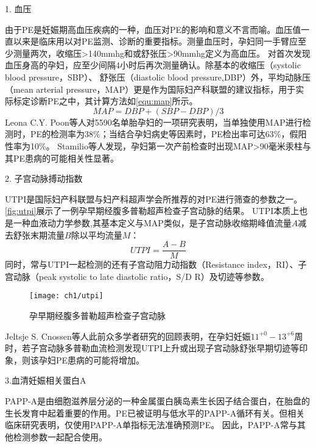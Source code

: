 1. 血压

由于PE是妊娠期高血压疾病的一种\cite{OAG9,HDASOM,2000s1}，血压对PE的影响和意义不言而喻。血压值一直以来是临床用以对PE监测、诊断的重要指标。测量血压时，孕妇同一手臂应至少测量两次，收缩压>140mmhg和或舒张压>90mmhg定义为高血压。
对首次发现血压身高的孕妇，应至少间隔4小时后再次测量确认\cite{OAG9}。除基本的收缩压（systolic blood pressure，SBP）、
舒张压（diastolic blood pressure,DBP）外，平均动脉压（mean arterial pressure，MAP）更是作为国际妇产科联盟的建议指标，用于实际标定诊断PE之中，其计算方法如\autoref{equ:map}所示\cite{FIGO}。
\begin{equation}
    \label{equ:map}
    MAP=DBP+(SBP-DBP)/3
\end{equation}
Leona C.Y. Poon\cite{Poon2008}等人对5590名单胎孕妇的一项研究表明，当单独使用MAP进行检测时，PE的检测率为38\%；当结合孕妇病史等因素时，PE检出率可达63\%，假阳性率为10\%。
Stamilio等人\cite{Stamilio2000}发现，孕妇第一次产前检查时出现MAP>90毫米汞柱与其PE患病的可能相关性显著。

2. 子宫动脉搏动指数

UTPI是国际妇产科联盟与妇产科超声学会所推荐的对PE进行筛查的参数之一\cite{FIGO,Sotiriadis2019}。\autoref{fig:utpi}展示了一例孕早期经腹多普勒超声检查子宫动脉的结果\cite{Sotiriadis2019}。
UTPI本质上也是一种血液动力学参数,其基本定义与MAP类似，是子宫动脉收缩期峰值流量$A$减去舒张末期流量$B$除以平均流量$M$\cite{Cnossen2008}：
\begin{equation}
    \label{equ:utpi}
    UTPI=\frac{A-B}{M}
\end{equation}
同时，常与UTPI一起检测的还有子宫动阻力动指数（Resistance index，RI）、子宫动脉（peak systolic to late diastolic ratio，S/D R）及切迹等参数\cite{Cnossen2008}。
\begin{figure}[htbp]
    \centering
    \texttt{[image: ch1/utpi]}
    \caption{\label{fig:utpi}孕早期经腹多普勒超声检查子宫动脉}
\end{figure}
Jeltsje S. Cnossen等人\cite{Cnossen2008}此前众多学者研究的回顾表明，在孕妇妊娠$11^{+0}-13^{+6}$周时，若子宫动脉多普勒血流检测发现UTPI上升或出现子宫动脉舒张早期切迹等印象，则该孕妇PE患病的可能将增加\cite{OAG9,Plasencia2008}。

3.血清妊娠相关蛋白A

PAPP-A是由细胞滋养层分泌的一种金属蛋白胰岛素生长因子结合蛋白，在胎盘的生长发育中起着重要的作用。PE已被证明与低水平的PAPP-A循环有关\cite{FIGO}。但相关临床研究表明，仅使用PAPP-A单指标无法准确预测PE\cite{Smith2002}。
因此，PAPP-A常与其他检测参数一起配合使用\cite{Poon2009,Tan2018}。 


